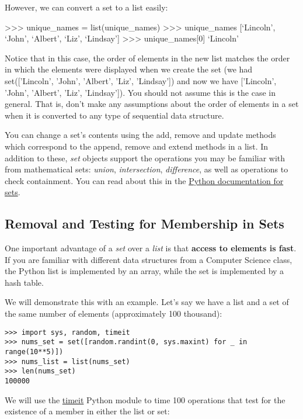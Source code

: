 However, we can convert a set to a list easily:

\textgreater{}\textgreater{}\textgreater{} unique\_names =
list(unique\_names) \textgreater{}\textgreater{}\textgreater{}
unique\_names {[}`Lincoln', `John', `Albert', `Liz', `Lindsay'{]}
\textgreater{}\textgreater{}\textgreater{} unique\_names{[}0{]}
`Lincoln'

Notice that in this case, the order of elements in the new list matches
the order in which the elements were displayed when we create the set
(we had set({[}'Lincoln', 'John', 'Albert', 'Liz',
'Lindsay'{]}) and now we have {[}'Lincoln', 'John', 'Albert', 'Liz',
'Lindsay'{]}). You should not assume this is the case in general. That
is, don't make any assumptions about the order of elements in a set when
it is converted to any type of sequential data structure.

You can change a set's contents using the add, remove and update methods
which correspond to the append, remove and extend methods in a list. In
addition to these, \emph{set} objects support the operations you may be
familiar with from mathematical sets: \emph{union}, \emph{intersection},
\emph{difference}, as well as operations to check containment. You can
read about this in the
\href{https://docs.python.org/2/library/stdtypes.html\#set}{Python
documentation for sets}.

\subsection{Removal and Testing for Membership in
Sets}\label{removal-and-testing-for-membership-in-sets}

One important advantage of a \emph{set} over a \emph{list} is that
\textbf{access to elements is fast}. If you are familiar with different
data structures from a Computer Science class, the Python list is
implemented by an array, while the set is implemented by a hash table.

We will demonstrate this with an example. Let's say we have a list and a
set of the same number of elements (approximately 100 thousand):

\begin{verbatim}
>>> import sys, random, timeit
>>> nums_set = set([random.randint(0, sys.maxint) for _ in range(10**5)])
>>> nums_list = list(nums_set)
>>> len(nums_set)
100000
\end{verbatim}

We will use the
\href{https://docs.python.org/2/library/timeit.html}{timeit} Python
module to time 100 operations that test for the existence of a member in
either the list or set:

